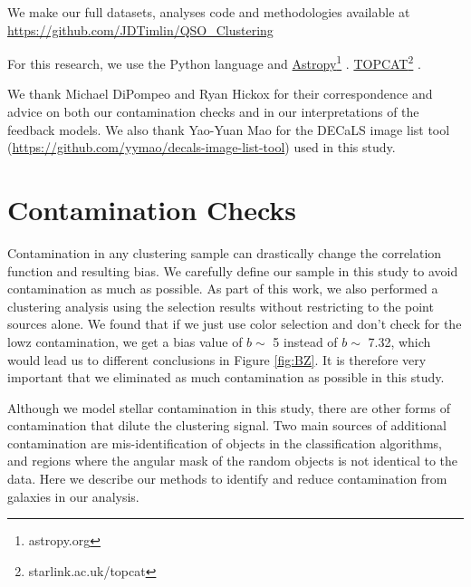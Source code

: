 \documentclass[apj, numberedappendix]{emulateapj}
\begin{document}
We make our full datasets, analyses code and methodologies available at
\url{https://github.com/JDTimlin/QSO_Clustering}%

For this research, we use the Python language and \href{http://www.astropy.org/}{Astropy}\footnote{astropy.org} \citep{astropy}. \href{http://www.star.bristol.ac.uk/~mbt/topcat/}{TOPCAT}\footnote{starlink.ac.uk/topcat} \citep{TOPCAT}. 

We thank Michael DiPompeo and Ryan Hickox for their correspondence and advice on both our contamination checks and in our interpretations of the feedback models. We also thank Yao-Yuan Mao for the DECaLS image list tool (\url{https://github.com/yymao/decals-image-list-tool}) used in this study. 


\appendix
\section{Contamination Checks}\label{append:contamination}
Contamination in any clustering sample can drastically change the correlation function and resulting bias. We carefully define our sample in this study to avoid contamination as much as possible. As part of this work, we also performed a clustering analysis using the selection results without restricting to the point sources alone. We found that if we just use color selection and don't check for the lowz contamination, we get a bias value of $b \sim$ 5 instead of $b \sim$ 7.32, which would lead us to different conclusions in Figure \ref{fig:BZ}. It is therefore very important that we eliminated as much contamination as possible in this study. 

Although we model stellar contamination in this study, there are other forms of contamination that dilute the clustering signal. Two main sources of additional contamination are mis-identification of objects in the classification algorithms, and regions where the angular mask of the random objects is not identical to the data. Here we describe our methods to identify and reduce contamination from galaxies in our analysis.
\end{document}
